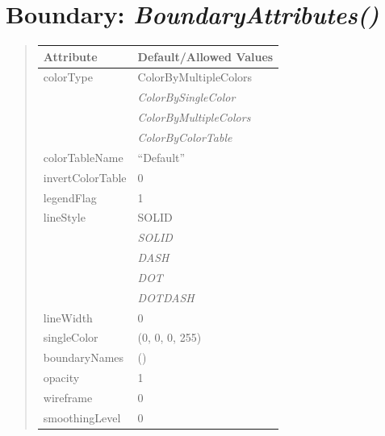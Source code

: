\documentclass[letterpaper,10pt,english]{sphinxmanual}
\begin{document}
\section{\textbf{Boundary}: \emph{BoundaryAttributes()}}
\label{attributes:boundary-boundaryattributes}
\begin{DUlineblock}{0em}
\item[] 
\end{DUlineblock}
\begin{quote}

\begin{tabulary}{\linewidth}{|L|L|}
\hline

\textbf{Attribute}
 & 
\textbf{Default/Allowed Values}
\\
\hline
colorType
 & 
ColorByMultipleColors
\\
\hline & 
\emph{ColorBySingleColor}
\\
\hline & 
\emph{ColorByMultipleColors}
\\
\hline & 
\emph{ColorByColorTable}
\\
\hline
colorTableName
 & 
``Default''
\\
\hline
invertColorTable
 & 
0
\\
\hline
legendFlag
 & 
1
\\
\hline
lineStyle
 & 
SOLID
\\
\hline & 
\emph{SOLID}
\\
\hline & 
\emph{DASH}
\\
\hline & 
\emph{DOT}
\\
\hline & 
\emph{DOTDASH}
\\
\hline
lineWidth
 & 
0
\\
\hline
singleColor
 & 
(0, 0, 0, 255)
\\
\hline
boundaryNames
 & 
()
\\
\hline
opacity
 & 
1
\\
\hline
wireframe
 & 
0
\\
\hline
smoothingLevel
 & 
0
\\
\hline\end{tabulary}

\end{quote}

\begin{DUlineblock}{0em}
\item[] 
\end{DUlineblock}

\begin{DUlineblock}{0em}
\item[] 
\end{DUlineblock}
\end{document}
